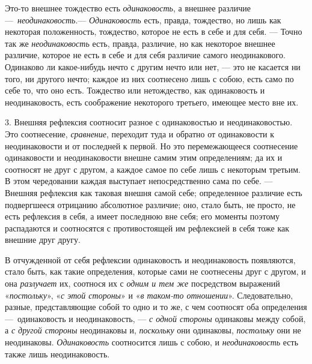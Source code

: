 Это-то внешнее тождество есть {\em одинаковость}, а
внешнее различие —~{\em неодинаковость}.—
{\em Одинаковость} есть, правда, тождество, но лишь как
некоторая положенность, тождество, которое не есть в себе и для себя. —
Точно так же {\em неодинаковость} есть, правда,
различие, но как некоторое внешнее различие, которое не есть в себе и для
себя различие самого неодинакового. Одинаково ли какое-нибудь нечто с
другим нечто или нет, — это не касается ни того, ни другого нечто; каждое
из них соотнесено лишь с собою, есть само по себе то, что оно есть.
Тождество или нетождество, как одинаковость и неодинаковость, есть
соображение некоторого третьего, имеющее место вне их.

3. Внешняя рефлексия соотносит разное с одинаковостью и неодинаковостью. Это
соотнесение, {\em сравнение}, переходит туда и обратно
от одинаковости к неодинаковости и от последней к первой. Но это
перемежающееся соотнесение одинаковости и неодинаковости внешне самим этим
определениям; да их и соотносят не друг с другом, а каждое самое по себе
лишь с некоторым третьим. В этом чередовании каждая выступает
непосредственно сама по себе. — Внешняя рефлексия как таковая внешня самой
себе; определенное различие есть подвергшееся отрицанию абсолютное
различие; оно, стало быть, не просто, не есть рефлексия в себя, а имеет
последнюю вне себя; его моменты поэтому распадаются и соотносятся с
противостоящей им рефлексией в себя тоже как внешние друг другу.

В отчужденной от себя рефлексии одинаковость и неодинаковость появляются,
стало быть, как такие определения, которые сами не соотнесены друг с
другом, и она {\em разлучает} их, соотнося их с
{\em одним и тем же} посредством выражений
«{\em постольку}», «{\em с этой
стороны}» и «{\em в таком-то отношении}».
Следовательно, разные, представляющие собой то одно и то же, с чем
соотносят оба определения —~одинаковость и неодинаковость, —
{\em с одной стороны} одинаковы между собой, а
{\em с другой стороны} неодинаковы и,
{\em поскольку} они одинаковы,
{\em постольку} они не неодинаковы.
{\em Одинаковость} соотносится лишь с собою, и
{\em неодинаковость} есть также лишь неодинаковость.

